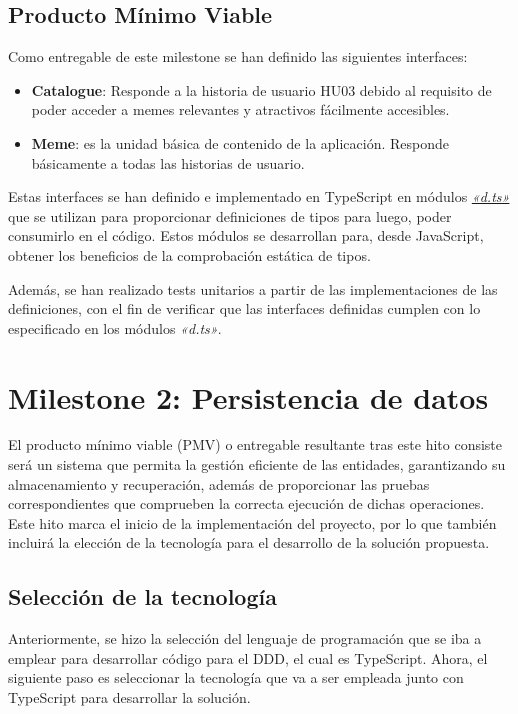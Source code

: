 \subsection{Producto Mínimo Viable}

Como entregable de este milestone se han definido las siguientes interfaces:

\begin{itemize}
    \item \textbf{Catalogue}: Responde a la historia de usuario HU03 debido al requisito de poder acceder a memes relevantes y atractivos fácilmente accesibles.
    \item \textbf{Meme}: es la unidad básica de contenido de la aplicación. Responde básicamente a todas las historias de usuario.
\end{itemize}

Estas interfaces se han definido e implementado en TypeScript en módulos \href{https://stackoverflow.com/q/21247278?stw=2 }{\textit{«d.ts»}} que se utilizan para proporcionar definiciones de tipos para luego, poder consumirlo en el código. Estos módulos se desarrollan para, desde JavaScript, obtener los beneficios de la comprobación estática de tipos.

Además, se han realizado tests unitarios a partir de las implementaciones de las definiciones, con el fin de verificar que las interfaces definidas cumplen con lo especificado en los módulos \textit{«d.ts»}.

\section{Milestone 2: Persistencia de datos}

El producto mínimo viable (PMV) o entregable resultante tras este hito consiste será un sistema que permita la gestión eficiente de las entidades, garantizando su almacenamiento y recuperación, además de proporcionar las pruebas correspondientes que comprueben la correcta ejecución de dichas operaciones. Este hito marca el inicio de la implementación del proyecto, por lo que también incluirá la elección de la tecnología para el desarrollo de la solución propuesta.

\subsection{Selección de la tecnología}

Anteriormente, se hizo la selección del lenguaje de programación que se iba a emplear para desarrollar código para el DDD, el cual es TypeScript. Ahora, el siguiente paso es seleccionar la tecnología que va a ser empleada junto con TypeScript para desarrollar la solución.

